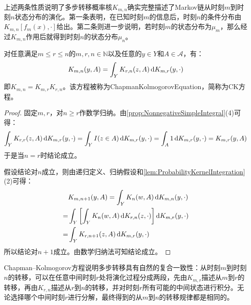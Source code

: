 \begin{note}
	上述两条性质说明了多步转移概率核$K_{m,n}$确实完整描述了Markov链从时刻$m$到时刻$n$状态分布的演化。第一条表明，在已知时刻$m$的信息后，时刻$n$的条件分布由$K_{m,n}[f_m(x),\cdot]$给出。第二条则进一步说明，若时刻$m$的状态分布为$\mu_m$，那么经过$K_{m,n}$作用后就得到时刻$n$的状态分布$\mu_n$。
\end{note}
\begin{theorem}\label{theo:ChapmanKolmogorov}
	对任意满足$m\leqslant r\leqslant n$的$m,r,n\in\mathbb{N}$以及任意的$y\in Y$和$A\in\mathscr{A}$，有：
	\begin{equation*}
		K_{m,n}(y,A)=\int_{Y}K_{r,n}(z,A)\mathop{}\!\mathrm{d} K_{m,r}(y,\cdot)
	\end{equation*}
	即$K_{m,n}=K_{m,r}K_{r,n}$。该方程被称为\gls{ChapmanKolmogorovEquation}，简称为CK方程。
\end{theorem}
\begin{proof}
	固定$m,r$，对$n\geqslant r$作数学归纳。由\cref{prop:NonnegativeSimpleIntegral}(4)可得：
	\begin{equation*}
		\int_{Y}K_{r,r}(z,A)\mathop{}\!\mathrm{d} K_{m,r}(y,\cdot)=\int_{Y}I(z\in A)\mathop{}\!\mathrm{d} K_{m,r}(y,\cdot)=\int_{A}1\mathop{}\!\mathrm{d} K_{m,r}(y,\cdot)=K_{m,r}(y,A)
	\end{equation*}
	于是当$n=r$时结论成立。\par
	假设结论对$n$成立，则由递归定义、归纳假设和\cref{lem:ProbabilityKernelIntegration}(2)可得：
	\begin{align*}
		&K_{m,n+1}(y,A)=\int_{Y}K_n(w,A)\mathop{}\!\mathrm{d} K_{m,n}(y,\cdot) \\
		=&\int_{Y}\left[\int_{Y}K_n(w,A)\mathop{}\!\mathrm{d} K_{r,n}(z,\cdot)\right]\mathop{}\!\mathrm{d} K_{m,r}(y,\cdot) \\
		=&\int_{Y}K_{r,n+1}(z,A)\mathop{}\!\mathrm{d} K_{m,r}(y,\cdot)
	\end{align*}
	所以结论对$n+1$成立。由数学归纳法可知结论成立。
\end{proof}
Chapman--Kolmogorov方程说明多步转移具有自然的复合一致性：从时刻$m$到时刻$n$的转移，可以在任意中间时刻$r$处将演化过程分成两段，先由$K_{m,r}$描述从$m$到$r$的转移，再由$K_{r,n}$描述从$r$到$n$的转移，并对时刻$r$所有可能的中间状态进行积分。无论选择哪个中间时刻$r$进行分解，最终得到的从$m$到$n$的转移规律都是相同的。

